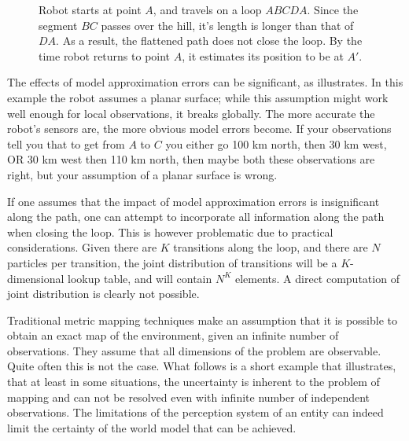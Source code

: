 \begin{figure}[htbp]
  \centering

\caption{Robot starts at point $A$, and travels on a loop
$ABCDA$. Since the segment $BC$ passes over the hill, it's length
is longer than that of $DA$. As a result, the flattened path does not
close the loop. By the time robot returns to point $A$, it
estimates its position to be at $A'$.}
  \label{fig:hump}
\end{figure}


The effects of model approximation errors can be significant, as
 illustrates. In this example the robot assumes a
planar surface; while this assumption might work well enough for local
observations, it breaks globally. The more accurate the robot's
sensors are, the more obvious model errors become. If your
observations tell you that to get from $A$ to $C$ you either go 100 km
north, then 30 km west, OR 30 km west then 110 km north, then maybe
both these observations are right, but your assumption of a planar
surface is wrong.

If one assumes that the impact of model approximation errors is
insignificant along the path, one can attempt to incorporate all
information along the path when closing the loop. This is however
problematic due to practical considerations. Given there are $K$
transitions along the loop, and there are $N$ particles per
transition, the joint distribution of transitions will be a
$K$-dimensional lookup table, and will contain $N^K$ elements. A
direct computation of joint distribution is clearly not possible.

Traditional metric mapping techniques make an assumption that it is
possible to obtain an exact map of the environment, given an infinite
number of observations. They assume that all dimensions of the problem
are observable. Quite often this is not the case. What follows is a
short example that illustrates, that at least in some situations, the
uncertainty is inherent to the problem of mapping and can not be
resolved even with infinite number of independent observations. The
limitations of the perception system of an entity can indeed limit the
certainty of the world model that can be achieved.


